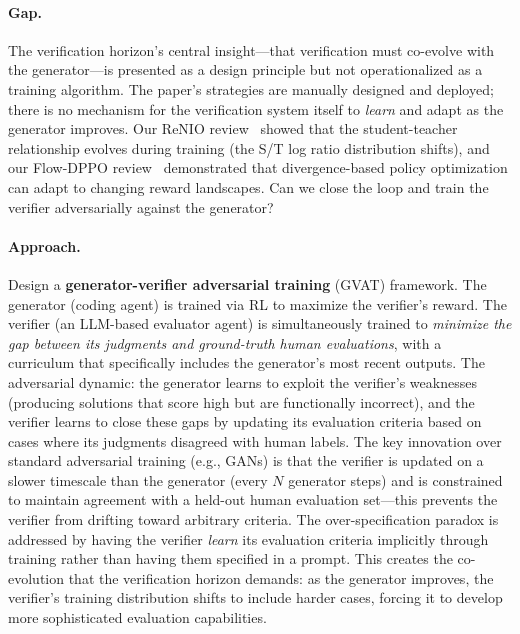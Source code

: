 \documentclass[11pt,a4paper]{article}
\begin{document}
\paragraph{Gap.} The verification horizon's central insight---that verification must co-evolve with the generator---is presented as a design principle but not operationalized as a training algorithm. The paper's strategies are manually designed and deployed; there is no mechanism for the verification system itself to \emph{learn} and adapt as the generator improves. Our ReNIO review~\cite{lin2026renio} showed that the student-teacher relationship evolves during training (the S/T log ratio distribution shifts), and our Flow-DPPO review~\cite{liu2026flowdppo} demonstrated that divergence-based policy optimization can adapt to changing reward landscapes. Can we close the loop and train the verifier adversarially against the generator?

\paragraph{Approach.} Design a \textbf{generator-verifier adversarial training} (GVAT) framework. The generator (coding agent) is trained via RL to maximize the verifier's reward. The verifier (an LLM-based evaluator agent) is simultaneously trained to \emph{minimize the gap between its judgments and ground-truth human evaluations}, with a curriculum that specifically includes the generator's most recent outputs. The adversarial dynamic: the generator learns to exploit the verifier's weaknesses (producing solutions that score high but are functionally incorrect), and the verifier learns to close these gaps by updating its evaluation criteria based on cases where its judgments disagreed with human labels. The key innovation over standard adversarial training (e.g., GANs) is that the verifier is updated on a slower timescale than the generator (every $N$ generator steps) and is constrained to maintain agreement with a held-out human evaluation set---this prevents the verifier from drifting toward arbitrary criteria. The over-specification paradox is addressed by having the verifier \emph{learn} its evaluation criteria implicitly through training rather than having them specified in a prompt. This creates the co-evolution that the verification horizon demands: as the generator improves, the verifier's training distribution shifts to include harder cases, forcing it to develop more sophisticated evaluation capabilities.
\end{document}
